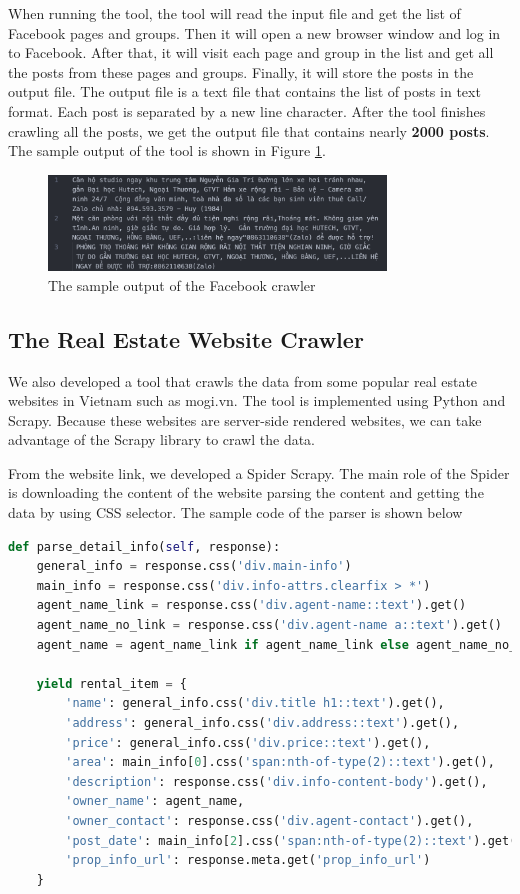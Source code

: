 When running the tool, the tool will read the input file and get the list of Facebook pages and groups. Then it will open a new browser window and log in to Facebook. After that, it will visit each page and group in the list and get all the posts from these pages and groups. Finally, it will store the posts in the output file. The output file is a text file that contains the list of posts in text format. Each post is separated by a new line character. After the tool finishes crawling all the posts, we get the output file that contains nearly \textbf{2000 posts}. The sample output of the tool is shown in Figure \ref{fig:facebook-crawler}.

\begin{figure}[ht]
    \centering
    \includegraphics[width=0.8\textwidth]{Images/9.Implementation/facebook_crawler_output.png}
    \caption{The sample output of the Facebook crawler}
    \label{fig:facebook-crawler}
\end{figure}

\subsection{The Real Estate Website Crawler}
We also developed a tool that crawls the data from some popular real estate websites in Vietnam such as mogi.vn. The tool is implemented using Python and Scrapy. Because these websites are server-side rendered websites, we can take advantage of the Scrapy library to crawl the data. 

From the website link, we developed a Spider Scrapy. The main role of the Spider is downloading the content of the website parsing the content and getting the data by using CSS selector. The sample code of the parser is shown below

\begin{lstlisting}[language=Python]
def parse_detail_info(self, response):
    general_info = response.css('div.main-info')
    main_info = response.css('div.info-attrs.clearfix > *')
    agent_name_link = response.css('div.agent-name::text').get()
    agent_name_no_link = response.css('div.agent-name a::text').get()
    agent_name = agent_name_link if agent_name_link else agent_name_no_link

    yield rental_item = {
        'name': general_info.css('div.title h1::text').get(),
        'address': general_info.css('div.address::text').get(),
        'price': general_info.css('div.price::text').get(),
        'area': main_info[0].css('span:nth-of-type(2)::text').get(),
        'description': response.css('div.info-content-body').get(),
        'owner_name': agent_name,
        'owner_contact': response.css('div.agent-contact').get(),
        'post_date': main_info[2].css('span:nth-of-type(2)::text').get(),
        'prop_info_url': response.meta.get('prop_info_url')
    }
\end{lstlisting}

